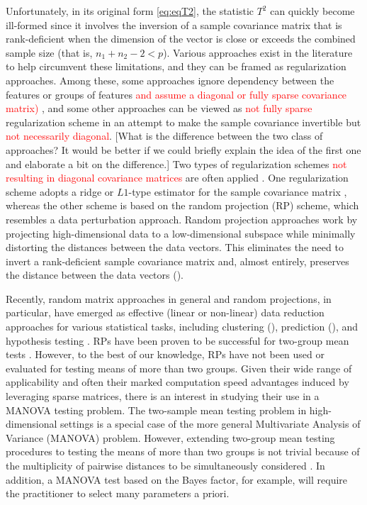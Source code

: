 \documentclass[times,sort&compress,3p]{elsarticle}
\theoremstyle{plain}%
\theoremstyle{definition}
\begin{document}
Unfortunately, in its original form \eqref{eq:eqT2}, the statistic $T^2$ can quickly become ill-formed since it involves the inversion of a sample covariance matrix that is rank-deficient when the dimension of the vector is close or exceeds the combined sample size (that is, $n_1+n_2-2 < p$). Various approaches exist in the literature to help circumvent these limitations, and they can be framed as regularization approaches. Among these, some approaches ignore dependency between the features or groups of features \textcolor{red}{and assume a diagonal or fully sparse covariance matrix)} \cite{ahmad2014u,bai1996effect,chen2010two,feng2017composite}, and some other approaches can be viewed as \textcolor{red}{not fully sparse} regularization scheme in an attempt to make the sample covariance invertible but \textcolor{red}{not necessarily diagonal}. {\color{blue}[What is the difference between the two class of approaches? It would be better if we could briefly explain the idea of the first one and elaborate a bit on the difference.]} Two types of regularization schemes \textcolor{red}{not resulting in diagonal covariance matrices} are often applied \cite{hu2020pairwise}. One regularization scheme adopts a ridge or $L1$-type estimator for the sample covariance matrix \cite{chen2011regularized,li2020adaptable}, whereas the other scheme is based on the random projection (RP) scheme, which resembles a data perturbation approach. Random projection approaches work by projecting high-dimensional data to a low-dimensional subspace while minimally distorting the distances between the data vectors. This eliminates the need to invert a rank-deficient sample covariance matrix and, almost entirely, preserves the distance between the data vectors (\cite{johnson84extensionslipschitz}). 

Recently, random matrix approaches in general and random projections, in particular, have emerged as effective (linear or non-linear) data reduction approaches for various statistical tasks, including clustering (\cite{vrahatis2020ensemble,wan2020sharp}), prediction (\cite{Mukhopadhyay2020targeted}), and hypothesis testing \cite{lopes2011more,srivastava2014raptt, zoh2018powerful}. RPs have been proven to be successful for two-group mean tests \cite{lopes2011more, srivastava2014raptt,zoh2018powerful}. However, to the best of our knowledge, RPs have not been used or evaluated for testing means of more than two groups. Given their wide range of applicability and often their marked computation speed advantages induced by leveraging sparse matrices, there is an interest in studying their use in a MANOVA testing problem. The two-sample mean testing problem in high-dimensional settings is a special case of the more general Multivariate Analysis of Variance (MANOVA) problem. However, extending two-group mean testing procedures to testing the means of more than two groups is not trivial because of the multiplicity of pairwise distances to be simultaneously considered \cite{cai2014high}. In addition, a MANOVA test based on the Bayes factor, for example, will require the practitioner to select many parameters a priori. 
\end{document}
